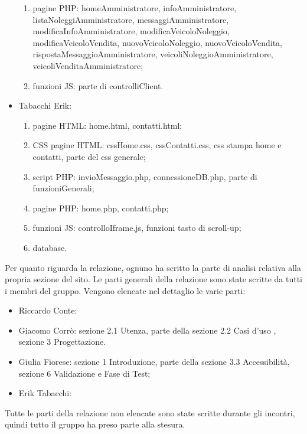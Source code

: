 \begin{itemize}
\begin{enumerate}
            \item pagine PHP: homeAmministratore, infoAmministratore, listaNoleggiAmministratore, messaggiAmministratore, modificaInfoAmministratore, modificaVeicoloNoleggio, modificaVeicoloVendita, nuovoVeicoloNoleggio, nuovoVeicoloVendita, rispostaMessaggioAmministratore, veicoliNoleggioAmministratore, veicoliVenditaAmministratore;
            \item funzioni JS: parte di controlliClient.
        \end{enumerate}
    \item Tabacchi Erik:
        \begin{enumerate}
            \item pagine HTML: home.html, contatti.html;
            \item CSS pagine HTML: cssHome.css, cssContatti.css, css stampa home e contatti, parte del css generale;
            \item script PHP: invioMessaggio.php, connessioneDB.php, parte di funzioniGenerali;
            \item pagine PHP: home.php, contatti.php;
            \item funzioni JS: controlloIframe.js, funzioni tasto di scroll-up;
            \item database.
        \end{enumerate}
\end{itemize}
Per quanto riguarda la relazione, ognuno ha scritto la parte di analisi relativa alla propria sezione del sito. Le parti generali della relazione sono state scritte da tutti i membri del gruppo.
Vengono elencate nel dettaglio le varie parti:
\begin{itemize}
    \item Riccardo Conte:
    \item Giacomo Corrò: sezione 2.1 Utenza, parte della sezione 2.2 Casi d'uso , sezione 3 Progettazione.
    \item Giulia Fiorese: sezione 1 Introduzione, parte della sezione 3.3 Accessibilità, sezione 6 Validazione e Fase di Test;
    \item Erik Tabacchi:
\end{itemize}
Tutte le parti della relazione non elencate sono state scritte durante gli incontri, quindi tutto il gruppo ha preso parte alla stesura.
\pagebreak
